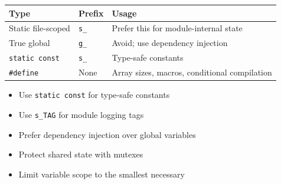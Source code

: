 \begin{center}
\begin{tabular}{|l|l|l|}
\hline
\textbf{Type} & \textbf{Prefix} & \textbf{Usage} \\
\hline
Static file-scoped & \texttt{s\_} & Prefer this for module-internal state \\
\hline
True global & \texttt{g\_} & Avoid; use dependency injection \\
\hline
\texttt{static const} & \texttt{s\_} & Type-safe constants \\
\hline
\texttt{\#define} & None & Array sizes, macros, conditional compilation \\
\hline
\end{tabular}
\end{center}

\begin{itemize}
    \item Use \texttt{static const} for type-safe constants
    \item Use \texttt{s\_TAG} for module logging tags
    \item Prefer dependency injection over global variables
    \item Protect shared state with mutexes
    \item Limit variable scope to the smallest necessary
\end{itemize}

